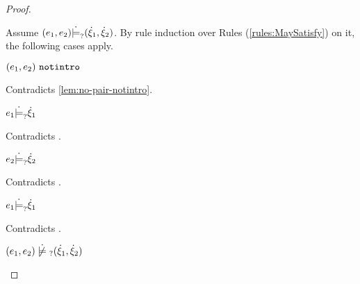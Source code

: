 \begin{proof}
\begin{byCases}
\begin{byCases}
\begin{byCases}
\begin{pfsteps*}
            \end{pfsteps*}
            Assume $(e_1 , e_2) \dot{\models}_{?} (\dot{\xi}_1 , \dot{\xi}_2)$. By rule induction over Rules (\ref{rules:MaySatisfy}) on it, the following cases apply.
            \begin{byCases}
            \item[\text{(\ref{rule:CMSNotIntro})}]
                \begin{pfsteps*}
                \item $(e_1 , e_2) ~\mathtt{notintro}$ 
                \end{pfsteps*}
                Contradicts \autoref{lem:no-pair-notintro}.
            \item[\text{(\ref{rule:CMSPair1})}]
                \begin{pfsteps*}
                \item $e_1 \dot{\models}_{?} \dot{\xi}_1$ 
                \end{pfsteps*}
                Contradicts .
            \item[\text{(\ref{rule:CMSPair2})}]
                \begin{pfsteps*}
                \item $e_2 \dot{\models}_{?} \dot{\xi}_2$ 
                \end{pfsteps*}
                Contradicts .
            \item[\text{(\ref{rule:CMSPair3})}]
                \begin{pfsteps*}
                \item $e_1 \dot{\models}_{?} \dot{\xi}_1$ 
                \end{pfsteps*}
                Contradicts .
            \end{byCases}
            \begin{pfsteps*}
            \item $\cnotmaysatisfy{\hpair{e_1}{e_2}}{\cpair{\hxi_1}{\hxi_2}}$ 
            \end{pfsteps*}
            

\end{byCases}
\end{byCases}
\end{byCases}
\end{proof}
